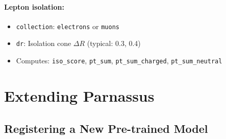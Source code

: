 \documentclass[11pt,a4paper]{article}
\begin{document}
\paragraph{Lepton isolation:}
\begin{itemize}
  \item \texttt{collection}: \texttt{electrons} or \texttt{muons}
  \item \texttt{dr}: Isolation cone $\Delta R$ (typical: 0.3, 0.4)
  \item Computes: \texttt{iso\_score}, \texttt{pt\_sum}, \texttt{pt\_sum\_charged},
    \texttt{pt\_sum\_neutral}
\end{itemize}

\section{Extending Parnassus}
\label{sec:extending}

\subsection{Registering a New Pre-trained Model}
\end{document}
